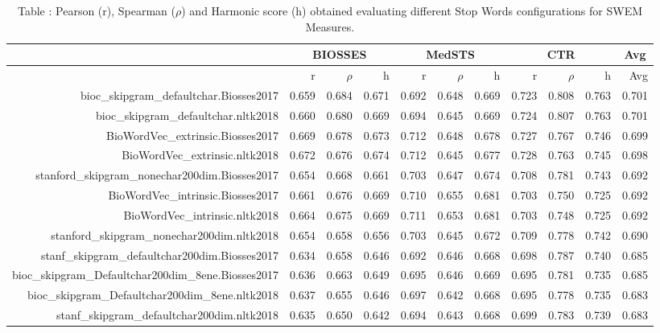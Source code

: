 \begin{table}[!h]
\centering
\caption{Table \label{table:Preprocessing_stopwords_SWEMMeasures}: Pearson (r), Spearman ($\rho$) and Harmonic score (h) obtained evaluating different Stop Words configurations for SWEM Measures.} 
\begingroup\tiny
\begin{tabular}{rrrrrrrrrrr}
  \hline \multicolumn{1}{c}{ } & \multicolumn{3}{c}{BIOSSES} & \multicolumn{3}{c}{MedSTS} & \multicolumn{3}{c}{CTR} & \multicolumn{1}{c}{Avg} \\  \hline
 & r & $\rho$ & h & r & $\rho$ & h & r & $\rho$ & h & Avg \\ 
  \hline
bioc\_skipgram\_defaultchar.Biosses2017 & 0.659 & 0.684 & 0.671 & 0.692 & 0.648 & 0.669 & 0.723 & 0.808 & 0.763 & 0.701 \\ 
  bioc\_skipgram\_defaultchar.nltk2018 & 0.660 & 0.680 & 0.669 & 0.694 & 0.645 & 0.669 & 0.724 & 0.807 & 0.763 & 0.701 \\ 
  BioWordVec\_extrinsic.Biosses2017 & 0.669 & 0.678 & 0.673 & 0.712 & 0.648 & 0.678 & 0.727 & 0.767 & 0.746 & 0.699 \\ 
  BioWordVec\_extrinsic.nltk2018 & 0.672 & 0.676 & 0.674 & 0.712 & 0.645 & 0.677 & 0.728 & 0.763 & 0.745 & 0.698 \\ 
  stanford\_skipgram\_nonechar200dim.Biosses2017 & 0.654 & 0.668 & 0.661 & 0.703 & 0.647 & 0.674 & 0.708 & 0.781 & 0.743 & 0.692 \\ 
  BioWordVec\_intrinsic.Biosses2017 & 0.661 & 0.676 & 0.669 & 0.710 & 0.655 & 0.681 & 0.703 & 0.750 & 0.725 & 0.692 \\ 
  BioWordVec\_intrinsic.nltk2018 & 0.664 & 0.675 & 0.669 & 0.711 & 0.653 & 0.681 & 0.703 & 0.748 & 0.725 & 0.692 \\ 
  stanford\_skipgram\_nonechar200dim.nltk2018 & 0.654 & 0.658 & 0.656 & 0.703 & 0.645 & 0.672 & 0.709 & 0.778 & 0.742 & 0.690 \\ 
  stanf\_skipgram\_defaultchar200dim.Biosses2017 & 0.634 & 0.658 & 0.646 & 0.692 & 0.646 & 0.668 & 0.698 & 0.787 & 0.740 & 0.685 \\ 
  bioc\_skipgram\_Defaultchar200dim\_8ene.Biosses2017 & 0.636 & 0.663 & 0.649 & 0.695 & 0.646 & 0.669 & 0.695 & 0.781 & 0.735 & 0.685 \\ 
  bioc\_skipgram\_Defaultchar200dim\_8ene.nltk2018 & 0.637 & 0.655 & 0.646 & 0.697 & 0.642 & 0.668 & 0.695 & 0.778 & 0.735 & 0.683 \\ 
  stanf\_skipgram\_defaultchar200dim.nltk2018 & 0.635 & 0.650 & 0.642 & 0.694 & 0.643 & 0.668 & 0.699 & 0.783 & 0.739 & 0.683 \\ 

\end{tabular}
\end{table}
